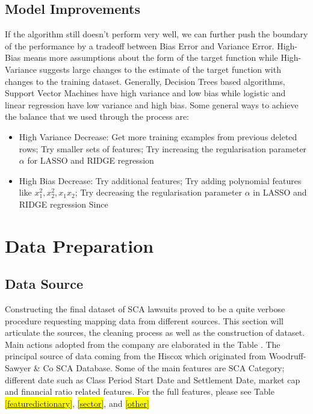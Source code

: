 \subsection{Model Improvements}
If the algorithm still doesn't perform very well, we can further push the boundary of the performance by a tradeoff between Bias Error and Variance Error. High-Bias means more assumptions about the form of the target function while High-Variance suggests large changes to the estimate of the target function with changes to the training dataset. Generally, Decision Trees based algorithms, Support Vector Machines have high variance and low bias while logistic and linear regression have low variance and high bias. Some general ways to achieve the balance that we used through the process are:
\begin{itemize}
   \item High Variance Decrease:  Get more training examples from previous deleted rows; Try smaller sets of features; Try increasing the regularisation parameter $\alpha$ for LASSO and RIDGE regression
   \item High Bias Decrease: Try additional features; Try adding polynomial features like $x_1^2, x_2^2, x_1 x_2$; Try decreasing the regularisation parameter $\alpha$ in LASSO and RIDGE regression
Since 
\end{itemize}

\section{Data Preparation}
\subsection{Data Source}
Constructing the final dataset of SCA lawsuits proved to be a quite verbose procedure requesting mapping data from different sources. This section will articulate the sources, the cleaning process as well as the construction of dataset.
Main actions adopted from the company are elaborated in the Table \hl{\label{manual}}. The principal source of data coming from the Hiscox which originated from Woodruff-Sawyer \& Co SCA Database. Some of the main features are SCA Category; different date such as Class Period Start Date and Settlement Date, market cap and financial ratio related features. For the full features, please see Table \hl{\ref{featuredictionary}}, \hl{\ref{sector}}, and \hl{\ref{other}}

